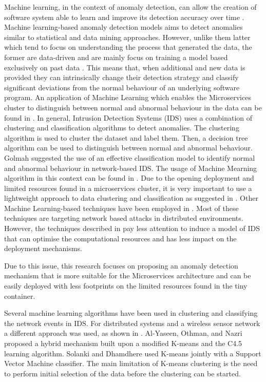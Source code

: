 Machine learning, in the context of  anomaly detection, can allow the creation of  software system able to learn and improve its detection accuracy over time \cite{bujlow2012method}.
Machine learning-based anomaly detection models aims to detect anomalies similar to statistical and data mining approaches. However, unlike them latter which tend to focus on understanding the process that generated the data, the former are data-driven and are mainly focus on training a model based exclusively on past data \cite{Patcha:2007hja}. This means that, when additional and new data is provided they can intrinsically change their detection strategy and classify significant deviations from the normal behaviour of an underlying software program.
An application of Machine Learning which enables the Microservices cluster to distinguish between normal and abnormal behaviour in the data can be found in \cite{Buczak:2016kt}. 
In general, Intrusion Detection Systems (IDS) uses a combination of clustering and classification algorithms to detect anomalies. The clustering algorithm is used to cluster the dataset and label them. Then, a decision tree algorithm can be used to distinguish between normal and abnormal behaviour.
Golmah \cite{golmah2014efficient} suggested the use of an effective classification model to identify normal and abnormal behaviour in network-based IDS. The usage of Machine Mearning algorithm  in this context can be found in  \cite{golmah2014efficient,Amudhavel:2016kj,haq2015application,Buczak:2016kt,doelitzscher2012agent}. Due to the  opening deployment and limited resources found in a microservices cluster, it is very important to use a lightweight approach to data clustering and classification as suggested in \cite{roesch1999snort,li2006lightweight,snapp1991dids}.
Other Machine Learning-based techniques have been employed in \cite{MdFudzee:2008p3737,pajouh2016two,hodo2016threat}. Most of these techniques are targeting network based attacks in distributed environments. However, the techniques described in \cite{MdFudzee:2008p3737,pajouh2016two,hodo2016threat} pay less attention to induce a model of IDS that can optimise the computational resources and has less impact on the deployment mechanisms. 

Due to this issue, this research focuses on proposing an anomaly detection mechanism that is more suitable for the Microservices architecture and can be easily deployed with less footprints on the limited resources found in the tiny container. 

Several machine learning algorithms have been used in clustering and classifying the network events in IDS. For distributed systems and a wireless sensor network a different approach was used, as shown in \cite{Mishra:2009p3734,lee1999data,li2006lightweight}. Al-Yaseen, Othman, and Nazri \cite{al2017multi} proposed a hybrid mechanism built upon a modified K-means and the C4.5 learning algorithm. Solanki and Dhamdhere \cite{solankiintrusion} used K-means jointly with a Support Vector Machine classifier. The main limitation of K-means clustering is the need to perform initial selection of the data before the clustering can be started. 
 
